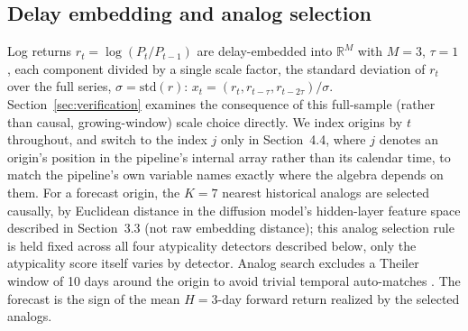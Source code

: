 \documentclass[preprint,12pt]{elsarticle}
\begin{document}
\subsection{Delay embedding and analog selection}
Log returns $r_t = \log(P_t / P_{t-1})$ are delay-embedded into $\mathbb{R}^M$ with $M=3$,
$\tau=1$, each component divided by a single scale factor, the standard deviation of $r_t$ over
the full series, $\sigma = \mathrm{std}(r)$: $x_t = (r_t, r_{t-\tau}, r_{t-2\tau})/\sigma$.
Section~\ref{sec:verification} examines the consequence of this full-sample (rather than causal,
growing-window) scale choice directly. We index origins by $t$ throughout, and switch to the
index $j$ only
in Section~4.4, where $j$ denotes an origin's position in the pipeline's internal array rather
than its calendar time, to match the pipeline's own variable names exactly where the algebra
depends on them. For a forecast origin, the $K=7$ nearest
historical analogs are selected causally, by Euclidean distance in the diffusion model's
hidden-layer feature space described in Section~3.3 (not raw embedding distance); this analog
selection rule is held fixed across all four atypicality detectors described below, only the
atypicality score itself varies by detector. Analog search
excludes a Theiler window of 10 days around the origin to avoid trivial temporal auto-matches
\citep{theiler1986}. The forecast is the sign of the mean $H=3$-day forward return realized by
the selected analogs.
\end{document}
